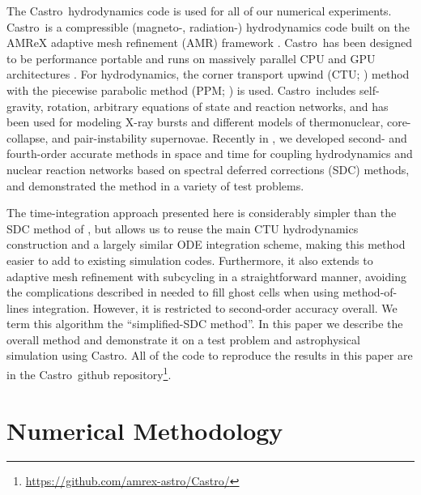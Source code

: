 \documentclass{aastex63}
\newcommand{\castro}{{\sf Castro}}
\newcommand{\MarginPar}[1]{\marginpar{\vskip-\baselineskip\raggedright\tiny\sffamily\hrule\smallskip{\color{red}#1}\par\smallskip\hrule}}
\begin{document}
The \castro\ hydrodynamics code \citep{castro,castro_joss} is used for
all of our numerical experiments.  \castro\ is a compressible
(magneto-, radiation-) hydrodynamics code built on the AMReX adaptive
mesh refinement (AMR) framework \citep{amrex_joss}.  \castro\ has been
designed to be performance portable and runs on massively parallel CPU
and GPU architectures \citep{castro_gpu}.  For hydrodynamics, the
corner transport upwind (CTU; \citealt{ppmunsplit}) method with the
piecewise parabolic method (PPM; \citealt{ppm,millercolella:2002}) is
used.  \castro\ includes self-gravity, rotation, arbitrary equations
of state and reaction networks, and has been used for modeling X-ray
bursts and different models of thermonuclear, core-collapse, and
pair-instability supernovae.  Recently in \citet{castro_sdc}, we
developed second- and fourth-order accurate methods in space and time
for coupling hydrodynamics and nuclear reaction networks based on
spectral deferred corrections (SDC) methods, and demonstrated the
method in a variety of test problems.

The time-integration approach presented here is considerably simpler
than the SDC method of \citet{castro_sdc}, but allows us to reuse the
main CTU \MarginPar{any cites to CCSE papers?}  hydrodynamics
construction and a largely similar ODE integration scheme, making this
method easier to add to existing simulation codes.  Furthermore, it
also extends to adaptive mesh refinement with subcycling in a
straightforward manner, avoiding the complications described in
\citep{mccorquodalecolella} needed to fill ghost cells when using
method-of-lines integration.  However, it is restricted to
second-order accuracy overall.  We term this algorithm the
``simplified-SDC method''.  In this paper we describe the overall
method and demonstrate it on a test problem and astrophysical
simulation using \castro.  All of the code to reproduce the results in
this paper are in the \castro\ github
repository\footnote{\url{https://github.com/amrex-astro/Castro/}}.

\section{Numerical Methodology}
\end{document}
